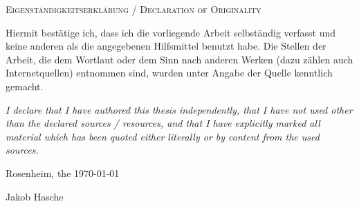 {
\large
\thispagestyle{empty}
\vspace*{\fill}

\noindent
\textsc{Eigenständigkeitserklärung / Declaration of Originality}

\medskip

\noindent
Hiermit bestätige ich, dass ich die vorliegende Arbeit selbständig verfasst und keine anderen als die angegebenen Hilfsmittel benutzt habe. Die Stellen der Arbeit, die dem Wortlaut oder dem Sinn nach anderen Werken (dazu zählen auch Internetquellen) entnommen sind, wurden unter Angabe der Quelle kenntlich gemacht.

\medskip

\textit{I declare that I have authored this thesis independently, that I have not used other than the declared sources / resources, and that I have explicitly marked all material which has been quoted either literally or by content from the used sources.}

\bigskip

\noindent
Rosenheim, the \today

\vspace*{2cm}

\noindent
Jakob Hasche
}

